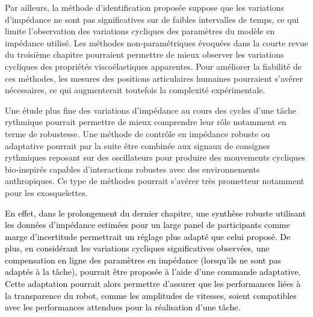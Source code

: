 Par ailleurs, la méthode d'identification proposée suppose que les variations d'impédance ne sont pas significatives sur de faibles intervalles de temps, ce qui limite l'observation des variations cycliques des paramètres du modèle en impédance utilisé. Les méthodes non-paramétriques évoquées dans la courte revue du troisième chapitre pourraient permettre de mieux observer les variations cycliques des propriétés viscoélastiques apparentes. Pour améliorer la fiabilité de ces méthodes, les mesures des positions articulaires humaines pourraient s'avérer nécessaires, ce qui augmenterait toutefois la complexité expérimentale.

Une étude plus fine des variations d'impédance au cours des cycles d'une tâche rythmique pourrait permettre de mieux comprendre leur rôle notamment en terme de robustesse. Une méthode de contrôle en impédance robuste ou adaptative pourrait par la suite être combinée aux signaux de consignes rythmiques reposant sur des oscillateurs pour produire des mouvements cycliques bio-inspirés capables d'interactions robustes avec des environnements anthropiques. Ce type de méthodes pourrait s'avérer très prometteur notamment pour les exosquelettes.

\textcolor{black}{En effet, dans le prolongement du dernier chapitre, une synthèse robuste utilisant les données d'impédance estimées pour un large panel de participants comme marge d'incertitude permettrait un réglage plus adapté que celui proposé. De plus, en considérant les variations cycliques significatives observées, une compensation en ligne des paramètres en impédance (lorsqu'ils ne sont pas adaptés à la tâche), pourrait être proposée à l'aide d'une commande adaptative. Cette adaptation pourrait alors permettre d'assurer que les performances liées à la transparence du robot, comme les amplitudes de vitesses, soient compatibles avec les performances attendues pour la réalisation d'une tâche.}